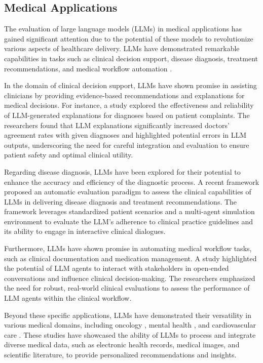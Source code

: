\documentclass[11pt]{article}
\begin{document}
\subsection{Medical Applications}

The evaluation of large language models (LLMs) in medical applications has gained significant attention due to the potential of these models to revolutionize various aspects of healthcare delivery. LLMs have demonstrated remarkable capabilities in tasks such as clinical decision support, disease diagnosis, treatment recommendations, and medical workflow automation \cite{ref211,ref212}.

In the domain of clinical decision support, LLMs have shown promise in assisting clinicians by providing evidence-based recommendations and explanations for medical decisions. For instance, a study \cite{ref211} explored the effectiveness and reliability of LLM-generated explanations for diagnoses based on patient complaints. The researchers found that LLM explanations significantly increased doctors' agreement rates with given diagnoses and highlighted potential errors in LLM outputs, underscoring the need for careful integration and evaluation to ensure patient safety and optimal clinical utility.

Regarding disease diagnosis, LLMs have been explored for their potential to enhance the accuracy and efficiency of the diagnostic process. A recent framework \cite{ref87} proposed an automatic evaluation paradigm to assess the clinical capabilities of LLMs in delivering disease diagnosis and treatment recommendations. The framework leverages standardized patient scenarios and a multi-agent simulation environment to evaluate the LLM's adherence to clinical practice guidelines and its ability to engage in interactive clinical dialogues.

Furthermore, LLMs have shown promise in automating medical workflow tasks, such as clinical documentation and medication management. A study \cite{ref212} highlighted the potential of LLM agents to interact with stakeholders in open-ended conversations and influence clinical decision-making. The researchers emphasized the need for robust, real-world clinical evaluations to assess the performance of LLM agents within the clinical workflow.

Beyond these specific applications, LLMs have demonstrated their versatility in various medical domains, including oncology \cite{ref213}, mental health \cite{ref214}, and cardiovascular care \cite{ref215}. These studies have showcased the ability of LLMs to process and integrate diverse medical data, such as electronic health records, medical images, and scientific literature, to provide personalized recommendations and insights.
\end{document}
